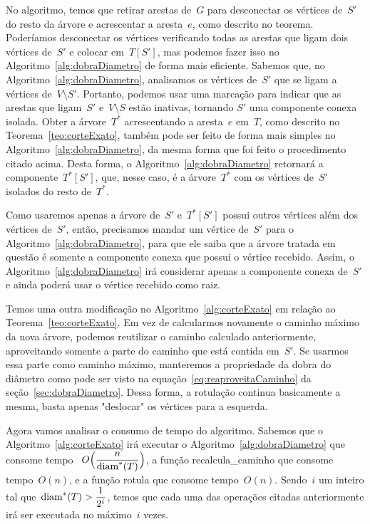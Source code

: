 		No algoritmo, temos que 
		retirar arestas de~$G$ para 
		desconectar os vértices de~$S'$ do resto da árvore
		e acrescentar a aresta~$e$, como descrito no teorema.
		Poderíamos desconectar os vértices verificando todas as arestas que 
		ligam dois vértices de~$S'$ e colocar em~$T[S']$, mas podemos
		fazer isso no Algoritmo~\ref{alg:dobraDiametro} de forma 
		mais eficiente. 
		Sabemos que, no Algoritmo~\ref{alg:dobraDiametro},
		analisamos os vértices de~$S'$ que se ligam a vértices 
		de~$V\setminus S'$. 
		Portanto, podemos usar uma marcação para indicar que as 
		arestas que ligam~$S'$ e~${V\setminus S}$ estão inativas, 
		tornando $S'$ uma componente conexa isolada. 
		Obter a árvore~$T^*$ acrescentando a aresta~$e$ em~$T$, como descrito no
		Teorema~\ref{teo:corteExato}, também pode ser feito de 
		forma mais simples no Algoritmo~\ref{alg:dobraDiametro},
		da mesma forma que foi feito o procedimento citado acima.
		Desta forma, o Algoritmo~\ref{alg:dobraDiametro} retornará
		a componente~$T^*[S']$, que, nesse caso, é a árvore~$T^*$ com
		os vértices de~$S'$ isolados do resto de~$T^*$.

		Como usaremos apenas a árvore de~$S'$ e~$T^*[S']$ possui outros 
		vértices além dos vértices de~$S'$,
		então, precisamos mandar um vértice de~$S'$ para
		o Algoritmo~\ref{alg:dobraDiametro},
		para que ele saiba que a árvore tratada em questão é
		somente a componente conexa que possui o vértice recebido.
		Assim, o Algoritmo~\ref{alg:dobraDiametro} irá considerar
		apenas a componente conexa de~$S'$ e ainda
		poderá usar o vértice recebido como raiz.


		Temos uma outra modificação no Algoritmo~\ref{alg:corteExato}   
		em relação ao Teorema~\ref{teo:corteExato}.
		Em vez de calcularmos novamente o caminho máximo da nova
		árvore, podemos reutilizar o caminho calculado anteriormente,
		aproveitando somente a parte do caminho que está contida 
		em~$S'$. 
		Se usarmos essa parte como caminho máximo,
		manteremos a propriedade da dobra do diâmetro como pode
		ser visto na equação~\ref{eq:reaproveitaCaminho} da 
		seção~\ref{sec:dobraDiametro}. 
		Dessa forma, a rotulação continua basicamente a mesma,
		basta apenas "deslocar" os vértices para a esquerda.

		\bigskip

		Agora vamos analisar o consumo de tempo do algoritmo.
		Sabemos que o Algoritmo~\ref{alg:corteExato} irá executar
		o Algoritmo~\ref{alg:dobraDiametro} que consome 
		tempo ~${O\Big(\dfrac{n}{\mathrm{diam}^*(T)}\Big)}$, a função
		{\sc recalcula\_caminho} que consome tempo~$O(n)$, e a função
		{\sc rotula} que consome tempo~$O(n)$.
		Sendo~$i$ um inteiro tal que~$\mathrm{diam}^*(T)>\dfrac{1}{2^i}$, 
		temos que cada uma das operações citadas anteriormente
		irá ser executada no máximo~$i$ vezes.

